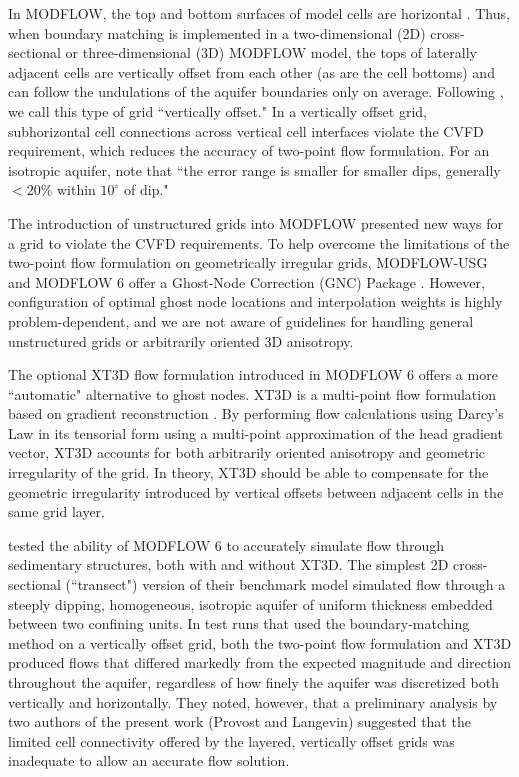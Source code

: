\documentclass{article}
\begin{document}
In MODFLOW, the top and bottom surfaces of model cells are horizontal \citep{modflow6gwf}. Thus, when boundary matching is implemented in a two-dimensional (2D) cross-sectional or three-dimensional (3D) MODFLOW model, the tops of laterally adjacent cells are vertically offset from each other (as are the cell bottoms) and can follow the undulations of the aquifer boundaries only on average. Following \cite{bardot2023}, we call this type of grid ``vertically offset." In a vertically offset grid, subhorizontal cell connections across vertical cell interfaces violate the CVFD requirement, which reduces the accuracy of two-point flow formulation. For an isotropic aquifer, \cite{hoaglund2003} note that ``the error range is smaller for smaller dips, generally $<20$\% within $10^{\circ}$ of dip."

The introduction of unstructured grids into MODFLOW \citep{modflowusg, modflow6gwf} presented new ways for a grid to violate the CVFD requirements. To help overcome the limitations of the two-point flow formulation on geometrically irregular grids, MODFLOW-USG and MODFLOW 6 offer a Ghost-Node Correction (GNC) Package \citep{modflowusg, modflow6gwf}. However, configuration of optimal ghost node locations and interpolation weights is highly problem-dependent, and we are not aware of guidelines for handling general unstructured grids or arbitrarily oriented 3D anisotropy.

The optional XT3D flow formulation \citep{modflow6xt3d} introduced in MODFLOW 6 offers a more ``automatic" alternative to ghost nodes. XT3D is a multi-point flow formulation \citep{edwards1998, aavatsmark2002} based on gradient reconstruction \citep{mavriplis2003leastsq, diskin2008accuracy}. By performing flow calculations using Darcy's Law in its tensorial form using a multi-point approximation of the head gradient vector, XT3D accounts for both arbitrarily oriented anisotropy and geometric irregularity of the grid. In theory, XT3D should be able to compensate for the geometric irregularity introduced by vertical offsets between adjacent cells in the same grid layer.

\cite{bardot2023} tested the ability of MODFLOW 6 to accurately simulate flow through sedimentary structures, both with and without XT3D. The simplest 2D cross-sectional (``transect") version of their benchmark model simulated flow through a steeply dipping, homogeneous, isotropic aquifer of uniform thickness embedded between two confining units. In test runs that used the boundary-matching method on a vertically offset grid, both the two-point flow formulation and XT3D produced flows that differed markedly from the expected magnitude and direction throughout the aquifer, regardless of how finely the aquifer was discretized {\color{red} both vertically and horizontally}. They noted, however, that a preliminary analysis by two authors of the present work (Provost and Langevin) suggested that the limited cell connectivity offered by the layered, vertically offset grids was inadequate to allow an accurate flow solution.
\end{document}
